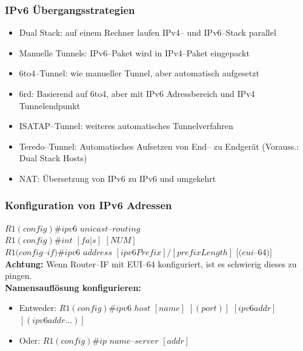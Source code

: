\documentclass[landscape,twocolumn,a4paper]{article}
\begin{document}
\begin{footnotesize}
\subsubsection{IPv6 Übergangsstrategien}
\begin{itemize}
	\item Dual Stack: auf einem Rechner laufen IPv4-- und IPv6--Stack parallel
	\item Manuelle Tunnels: IPv6--Paket wird in IPv4--Paket eingepackt
	\item 6to4--Tunnel: wie manueller Tunnel, aber automatisch aufgesetzt
	\item 6rd: Basierend auf 6to4, aber mit IPv6 Adressbereich und IPv4 Tunnelendpunkt
	\item ISATAP--Tunnel: weiteres automatisches Tunnelverfahren
	\item Teredo--Tunnel: Automatisches Aufsetzen von End-- zu Endgerät (Vorauss.: Dual Stack Hosts)
	\item NAT: Übersetzung von IPv6 zu IPv6 und umgekehrt
\end{itemize}

\subsubsection{Konfiguration von IPv6 Adressen}
$R1(config)\#ipv6$ $unicast$--$routing$\\
$R1(config)\#int$ $[fa|s]$ $[NUM]$\\
$R1(config$--$if)\#ipv6$ $address$ $[ipv6Prefix]/[prefixLength]$ $[(eui$--$64)]$\\
\textbf{Achtung:} Wenn Router--IF mit EUI--64 konfiguriert, ist es schwierig dieses zu pingen.\\
\textbf{Namensauflösung konfigurieren:}
\vspace{-3mm}
\begin{itemize}
	\item Entweder: $R1(config)\#ipv6$ $host$ $[name]$ $[(port)]$ $[ipv6addr]$ $[({ipv6addr}...)]$
	\item Oder: $R1(config)\#ip$ $name$--$server$ $[addr]$
\end{itemize}


\end{footnotesize}
\end{document}
